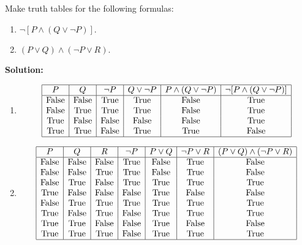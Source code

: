 Make truth tables for the following formulas:
\begin{enumerate}[label=(\alph*)]
    \item $\neg [P \wedge (Q \vee \neg P)]$.
    \item $(P \vee Q) \wedge (\neg P \vee R).$
\end{enumerate}

\textbf{Solution:}
\begin{enumerate}[label=(\alph*)]
\item 
\[
\begin{array}{|c|c|c|c|c|c|}
\hline
P & Q & \neg P & Q \vee \neg P & P \wedge (Q \vee \neg P) & \neg [P \wedge (Q \vee \neg P)] \\
\hline
\text{False} & \text{False} & \text{True} & \text{True} & \text{False} & \text{True} \\
\text{False} & \text{True} & \text{True} & \text{True} & \text{False} & \text{True} \\
\text{True} & \text{False} & \text{False} & \text{False} & \text{False} & \text{True} \\
\text{True} & \text{True} & \text{False} & \text{True} & \text{True} & \text{False} \\
\hline
\end{array}
\]

\item
\[
\begin{array}{|c|c|c|c|c|c|c|}
\hline
P & Q & R & \neg P & P \vee Q & \neg P \vee R & (P \vee Q) \wedge (\neg P \vee R) \\
\hline
\text{False} & \text{False} & \text{False} & \text{True} & \text{False} & \text{True} & \text{False} \\
\text{False} & \text{False} & \text{True} & \text{True} & \text{False} & \text{True} & \text{False} \\
\text{False} & \text{True} & \text{False} & \text{True} & \text{True} & \text{True} & \text{True} \\
\text{True} & \text{False} & \text{False} & \text{False} & \text{True} & \text{False} & \text{False} \\
\text{False} & \text{True} & \text{True} & \text{True} & \text{True} & \text{True} & \text{True} \\
\text{True} & \text{False} & \text{True} & \text{False} & \text{True} & \text{True} & \text{True} \\
\text{True} & \text{True} & \text{False} & \text{False} & \text{True} & \text{False} & \text{False} \\
\text{True} & \text{True} & \text{True} & \text{False} & \text{True} & \text{True} & \text{True} \\
\hline
\end{array}
\]
\end{enumerate}

\pagebreak